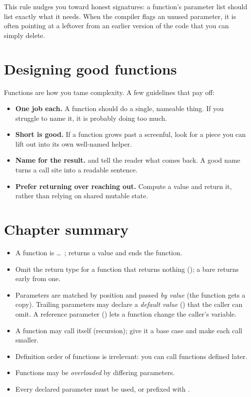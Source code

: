 \begin{tip}
This rule nudges you toward honest signatures: a function's parameter list should
list exactly what it needs. When the compiler flags an unused parameter, it is
often pointing at a leftover from an earlier version of the code that you can
simply delete.
\end{tip}

\section{Designing good functions}

Functions are how you tame complexity. A few guidelines that pay off:

\begin{itemize}[leftmargin=1.4em]
  \item \textbf{One job each.} A function should do a single, nameable thing. If
        you struggle to name it, it is probably doing too much.
  \item \textbf{Short is good.} If a function grows past a screenful, look for a
        piece you can lift out into its own well-named helper.
  \item \textbf{Name for the result.}  and
         tell the reader what comes back. A good name turns
        a call site into a readable sentence.
  \item \textbf{Prefer returning over reaching out.} Compute a value and return
        it, rather than relying on shared mutable state.
\end{itemize}

\section{Chapter summary}

\begin{itemize}[leftmargin=1.4em]
  \item A function is  \dots\ ;
         returns a value and ends the function.
  \item Omit the return type for a function that returns nothing ();
        a bare  returns early from one.
  \item Parameters are matched by position and passed \emph{by value} (the
        function gets a copy). Trailing parameters may declare a \emph{default
        value} () that the caller can omit. A reference
        parameter () lets a function change the caller's
         variable.
  \item A function may call itself (recursion); give it a base case and make each
        call smaller.
  \item Definition order of functions is irrelevant: you can call functions
        defined later.
  \item Functions may be \emph{overloaded} by differing parameters.
  \item Every declared parameter must be used, or prefixed with \code{\_}.
\end{itemize}

